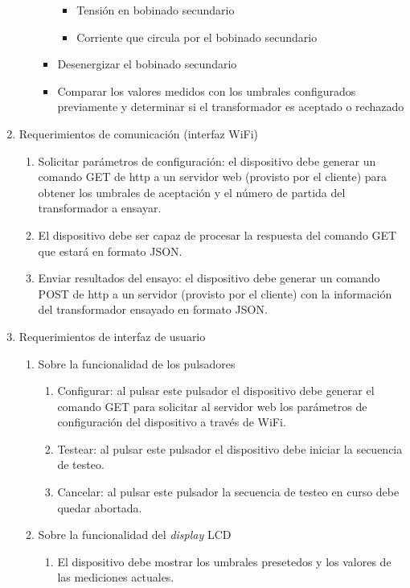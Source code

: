 \documentclass[11pt]{charter}
\begin{document}
\begin{enumerate}
\begin{enumerate}
\begin{itemize}
\begin{itemize}
			\item Tensión en bobinado secundario
			\item Corriente que circula por el bobinado secundario
			\end{itemize}
		\item Desenergizar el bobinado secundario
		\item Comparar los valores medidos con los umbrales configurados previamente y determinar si el transformador es aceptado o rechazado
		\end{itemize}
	\end{enumerate}	
\item Requerimientos de comunicación (interfaz WiFi)
	\begin{enumerate}
	\item Solicitar parámetros de configuración: el dispositivo debe generar un comando GET de http a un servidor web (provisto por el cliente) para obtener los umbrales de aceptación y el número de partida del transformador a ensayar.
	\item El dispositivo debe ser capaz de procesar la respuesta del comando GET que estará en formato JSON.
	\item Enviar resultados del ensayo: el dispositivo debe generar un comando POST de http a un servidor (provisto por el cliente) con la información del transformador ensayado en formato JSON.
	\end{enumerate}
\item Requerimientos de interfaz de usuario
	\begin{enumerate}
	\item Sobre la funcionalidad de los pulsadores
		\begin{enumerate}
		\item Configurar: al pulsar este pulsador el dispositivo debe generar el comando GET para solicitar al servidor web los parámetros de configuración del dispositivo a través de WiFi.
		\item Testear: al pulsar este pulsador el dispositivo debe iniciar la secuencia de testeo.
		\item Cancelar: al pulsar este pulsador la secuencia de testeo en curso debe quedar abortada.
		\end{enumerate}
	\item Sobre la funcionalidad del \textit{display} LCD
		\begin{enumerate}
		\item El dispositivo debe mostrar los umbrales presetedos y los valores de las mediciones actuales.

\end{enumerate}
\end{enumerate}
\end{enumerate}
\end{document}
